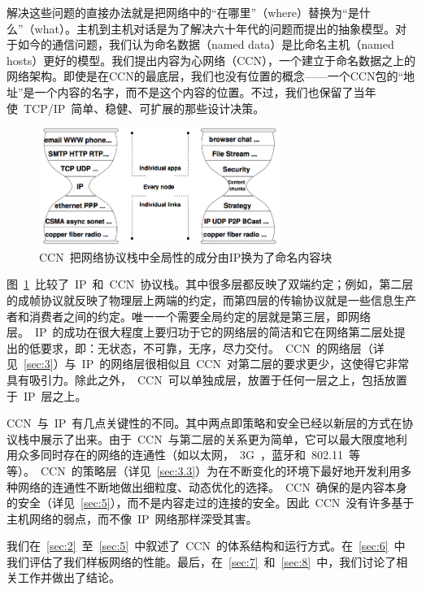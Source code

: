 解决这些问题的直接办法就是把网络中的“在哪里”（where）替换为“是什么”（what）。主机到主机对话是为了解决六十年代的问题而提出的抽象模型。对于如今的通信问题，我们认为命名数据（named data）是比命名主机（named hosts）更好的模型。我们提出内容为心网络（CCN），一个建立于命名数据之上的网络架构。即使是在CCN的最底层，我们也没有位置的概念——一个CCN包的“地址”是一个内容的名字，而不是这个内容的位置。不过，我们也保留了当年使~TCP/IP~简单、稳健、可扩展的那些设计决策。

\begin{figure}
  \centering
  \includegraphics[width=0.7\textwidth]{images/narrow_waist}
  \caption{CCN~把网络协议栈中全局性的成分由IP换为了命名内容块} %
  \label{narrow_waist}
\end{figure}

图~\ref{narrow_waist}~比较了~IP~和~CCN~协议栈。其中很多层都反映了双端约定；例如，第二层的成帧协议就反映了物理层上两端的约定，而第四层的传输协议就是一些信息生产者和消费者之间的约定。唯一一个需要全局约定的层就是第三层，即网络层。~IP~的成功在很大程度上要归功于它的网络层的简洁和它在网络第二层处提出的低要求，即：无状态，不可靠，无序，尽力交付。~CCN~的网络层（详见~\ref{sec:3}）与~IP~的网络层很相似且~CCN~对第二层的要求更少，这使得它非常具有吸引力。除此之外，~CCN~可以单独成层，放置于任何一层之上，包括放置于~IP~层之上。%

CCN~与~IP~有几点关键性的不同。其中两点即策略和安全已经以新层的方式在协议栈中展示了出来。由于~CCN~与第二层的关系更为简单，它可以最大限度地利用众多同时存在的网络的连通性（如以太网，~3G~，蓝牙和~802.11~等等）。~CCN~的策略层（详见~\ref{sec:3.3}）为在不断变化的环境下最好地开发利用多种网络的连通性不断地做出细粒度、动态优化的选择。~CCN~确保的是内容本身的安全（详见~\ref{sec:5}），而不是内容走过的连接的安全。因此~CCN~没有许多基于主机网络的弱点，而不像~IP~网络那样深受其害。

我们在~\ref{sec:2}~至~\ref{sec:5}~中叙述了~CCN~的体系结构和运行方式。在~\ref{sec:6}~中我们评估了我们样板网络的性能。最后，在~\ref{sec:7}~和~\ref{sec:8}~中，我们讨论了相关工作并做出了结论。



